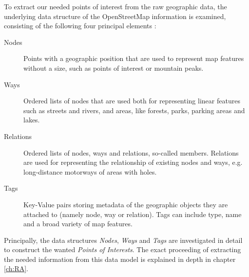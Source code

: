 To extract our needed points of interest from the raw geographic data, the underlying data structure of the OpenStreetMap information is examined, consisting of the following four principal elements \cite{osm:elements}: 
\begin{description}
\item[Nodes] Points with a geographic position that are used to represent map features without a size, such as points of interest or mountain peaks. 
\item[Ways] Ordered lists of nodes that are used both for representing linear features such as streets and rivers, and areas, like forests, parks, parking areas and lakes.
\item[Relations] Ordered lists of nodes, ways and relations, so-called members. Relations are used for representing the relationship of existing nodes and ways, e.g. long-distance motorways of areas with holes.
\item[Tags] Key-Value pairs storing metadata of the geographic objects they are attached to (namely node, way or relation). Tags can include type, name and a broad variety of map features.
\end{description} 


Principally, the data structures \textit{Nodes}, \textit{Ways} and \textit{Tags} are investigated in detail to construct the wanted \textit{Points of Interests}. The exact proceeding of extracting the needed information from this data model is explained in depth in chapter \ref{ch:RA}.  
